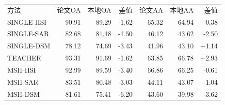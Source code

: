 \begin{tabular}{lrrrrrr}
\toprule
方法 & 论文OA & 本地OA & 差值 & 论文AA & 本地AA & 差值 \\
SINGLE-HSI & 90.91 & 89.29 & -1.62 & 65.32 & 64.94 & -0.38 \\
SINGLE-SAR & 82.68 & 81.18 & -1.50 & 46.12 & 43.62 & -2.50 \\
SINGLE-DSM & 78.12 & 74.69 & -3.43 & 41.96 & 43.10 & +1.14 \\
TEACHER & 93.31 & 91.69 & -1.62 & 63.85 & 66.78 & +2.93 \\
MSH-HSI & 92.99 & 89.59 & -3.40 & 66.86 & 66.25 & -0.61 \\
MSH-SAR & 83.51 & 80.48 & -3.03 & 44.11 & 43.07 & -1.04 \\
MSH-DSM & 81.61 & 75.41 & -6.20 & 43.60 & 39.98 & -3.62 \\
\bottomrule
\end{tabular}
